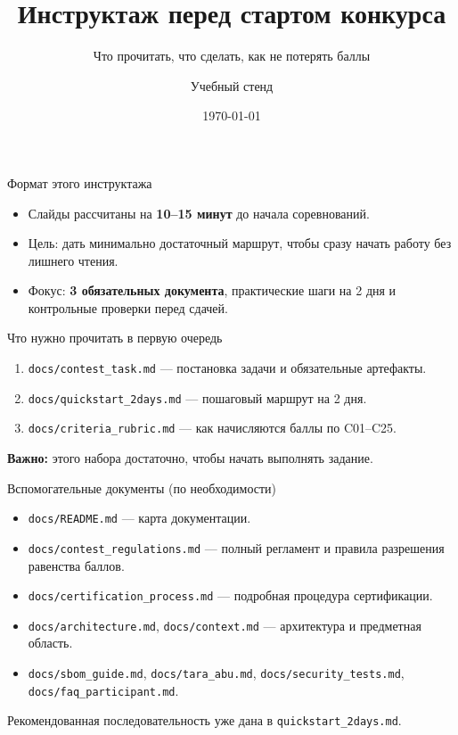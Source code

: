 \documentclass[aspectratio=169]{beamer}
\title{Инструктаж перед стартом конкурса}
\subtitle{Что прочитать, что сделать, как не потерять баллы}
\author{Учебный стенд}
\institute{Конкурс / прототип}
\date{\today}
\begin{document}
\begin{frame}
  \titlepage
\end{frame}

\begin{frame}{Формат этого инструктажа}
  \begin{itemize}
    \item Слайды рассчитаны на \textbf{10--15 минут} до начала соревнований.
    \item Цель: дать минимально достаточный маршрут, чтобы сразу начать работу без лишнего чтения.
    \item Фокус: \textbf{3 обязательных документа}, практические шаги на 2 дня и контрольные проверки перед сдачей.
  \end{itemize}
\end{frame}

\begin{frame}{Что нужно прочитать в первую очередь}
  \begin{enumerate}
    \item \texttt{docs/contest\_task.md} --- постановка задачи и обязательные артефакты.
    \item \texttt{docs/quickstart\_2days.md} --- пошаговый маршрут на 2 дня.
    \item \texttt{docs/criteria\_rubric.md} --- как начисляются баллы по C01--C25.
  \end{enumerate}
  \vspace{0.6em}
  \textbf{Важно:} этого набора достаточно, чтобы начать выполнять задание.
\end{frame}

\begin{frame}{Вспомогательные документы (по необходимости)}
  \begin{itemize}
    \item \texttt{docs/README.md} --- карта документации.
    \item \texttt{docs/contest\_regulations.md} --- полный регламент и правила разрешения равенства баллов.
    \item \texttt{docs/certification\_process.md} --- подробная процедура сертификации.
    \item \texttt{docs/architecture.md}, \texttt{docs/context.md} --- архитектура и предметная область.
    \item \texttt{docs/sbom\_guide.md}, \texttt{docs/tara\_abu.md}, \texttt{docs/security\_tests.md}, \texttt{docs/faq\_participant.md}.
  \end{itemize}
  \vspace{0.4em}
  Рекомендованная последовательность уже дана в \texttt{quickstart\_2days.md}.
\end{frame}
\end{document}
